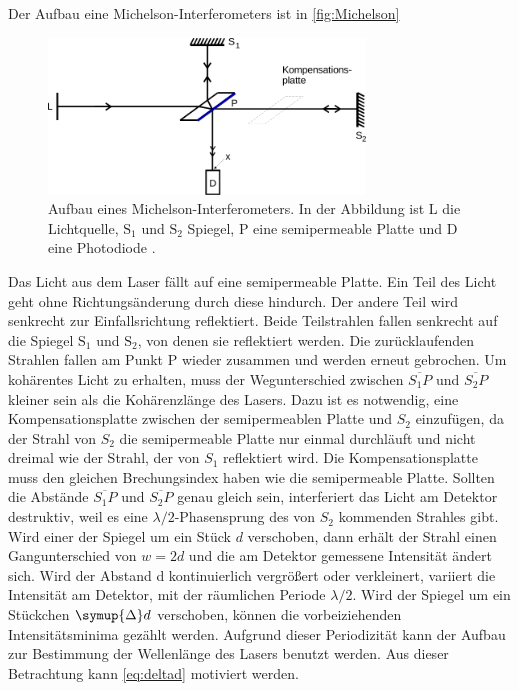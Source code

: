 Der Aufbau eine Michelson-Interferometers ist in \autoref{fig:Michelson}
\begin{figure}[H]
    \centering
    \includegraphics[width=0.75\textwidth]{figures/Abb1.pdf}
    \caption{Aufbau eines Michelson-Interferometers. In der Abbildung ist L die Lichtquelle, $\textrm{S}_1$ und $\textrm{S}_2$  Spiegel, P eine semipermeable Platte und D eine Photodiode \cite{ap11}.}
    \label{fig:Michelson}
\end{figure}

Das Licht aus dem Laser fällt auf eine semipermeable Platte. Ein Teil des Licht geht ohne Richtungsänderung durch diese hindurch. Der andere Teil wird senkrecht zur Einfallsrichtung reflektiert. 
Beide Teilstrahlen fallen  senkrecht auf die Spiegel $ \textrm{S}_1 $ und $ \textrm{S}_2 $, von denen sie reflektiert werden.
Die zurücklaufenden Strahlen fallen am Punkt P wieder zusammen und werden erneut gebrochen. 
Um kohärentes Licht zu erhalten, muss der Wegunterschied zwischen $\overline{S_1 P}$ und $\overline{S_2 P} $ kleiner sein als die Kohärenzlänge des Lasers.
Dazu ist es notwendig, eine Kompensationsplatte zwischen der semipermeablen Platte und $S_2$ einzufügen, da der Strahl von $S_2$ die semipermeable Platte nur einmal durchläuft und nicht dreimal wie der Strahl, der von $S_1$ reflektiert wird. 
Die Kompensationsplatte muss den gleichen Brechungsindex haben wie die semipermeable Platte.
Sollten die Abstände $\overline{S_1 P}$ und $\overline{S_2 P} $ genau gleich sein, interferiert das Licht am Detektor destruktiv, weil es eine $\lambda /2 $-Phasensprung des von $S_2$ kommenden Strahles gibt. \\

Wird einer der Spiegel um ein Stück $d$ verschoben, dann erhält der Strahl einen Gangunterschied von $w = 2d$ und die am Detektor gemessene Intensität ändert sich.
Wird der Abstand d kontinuierlich vergrößert oder verkleinert, variiert die Intensität am Detektor, mit der räumlichen Periode $\lambda / 2$. 
Wird der Spiegel um ein Stückchen $ \symup{\Delta} d$ verschoben, können die vorbeiziehenden Intensitätsminima gezählt werden.
Aufgrund dieser Periodizität kann der Aufbau zur Bestimmung der Wellenlänge des Lasers benutzt werden. 
Aus dieser Betrachtung kann \eqref{eq:deltad} motiviert werden.

